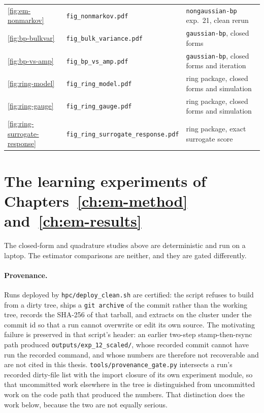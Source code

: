 \begin{center}
\begin{minipage}{\linewidth}
\begin{tabular}{@{}lll@{}}
\ref{fig:em-nonmarkov} & \texttt{fig\_nonmarkov.pdf} & \texttt{nongaussian-bp} exp.~21, clean rerun \\
\ref{fig:bp-bulkvar} & \texttt{fig\_bulk\_variance.pdf} & \texttt{gaussian-bp}, closed forms \\
\ref{fig:bp-vs-amp} & \texttt{fig\_bp\_vs\_amp.pdf} & \texttt{gaussian-bp}, closed forms and iteration \\
\ref{fig:ring-model} & \texttt{fig\_ring\_model.pdf} & ring package, closed forms and simulation \\
\ref{fig:ring-gauge} & \texttt{fig\_ring\_gauge.pdf} & ring package, closed forms and simulation \\
\ref{fig:ring-surrogate-response} & \texttt{fig\_ring\_surrogate\_response.pdf} & ring package, exact surrogate score \\
\bottomrule
\end{tabular}

\end{minipage}
\end{center}

\section{The learning experiments of Chapters~\ref{ch:em-method}
and~\ref{ch:em-results}}\label{sec:repro-learning}

The closed-form and quadrature studies above are deterministic and run on a
laptop. The estimator comparisons are neither, and they are gated
differently.

\paragraph{Provenance.} Runs deployed by \texttt{hpc/deploy\_clean.sh} are
certified: the script refuses to build from a dirty tree, ships a
\texttt{git archive} of the commit rather than the working tree, records the
SHA-256 of that tarball, and extracts on the cluster under the commit id so that
a run cannot overwrite or edit its own source. The motivating failure is
preserved in that script's header: an earlier two-step stamp-then-rsync path
produced \texttt{outputs/exp\_12\_scaled/}, whose recorded commit cannot have
run the recorded command, and whose numbers are therefore not recoverable and
are not cited in this thesis. \texttt{tools/provenance\_gate.py} intersects a
run's recorded dirty-file list with the import closure of its own experiment
module, so that uncommitted work elsewhere in the tree is distinguished from
uncommitted work on the code path that produced the numbers. That distinction
does the work below, because the two are not equally serious.


